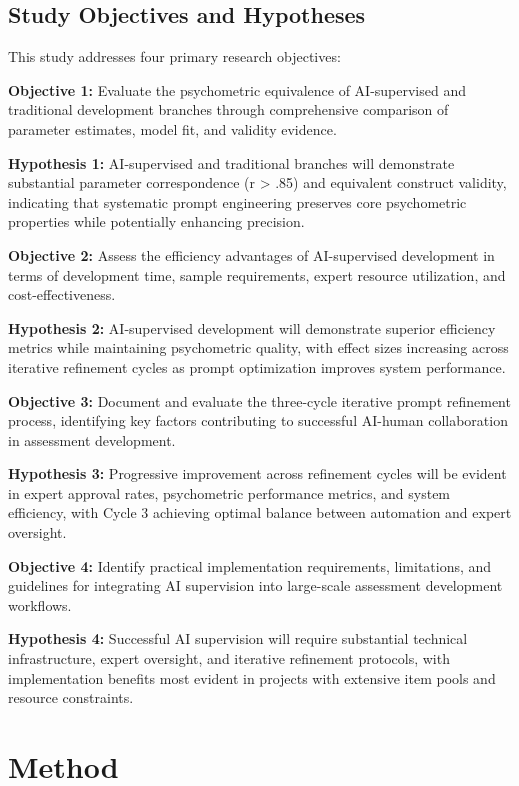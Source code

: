 \documentclass[12pt,a4paper]{article}
\begin{document}
\subsection{Study Objectives and Hypotheses}

This study addresses four primary research objectives:

\textbf{Objective 1:} Evaluate the psychometric equivalence of AI-supervised and traditional development branches through comprehensive comparison of parameter estimates, model fit, and validity evidence.

\textbf{Hypothesis 1:} AI-supervised and traditional branches will demonstrate substantial parameter correspondence (r > .85) and equivalent construct validity, indicating that systematic prompt engineering preserves core psychometric properties while potentially enhancing precision.

\textbf{Objective 2:} Assess the efficiency advantages of AI-supervised development in terms of development time, sample requirements, expert resource utilization, and cost-effectiveness.

\textbf{Hypothesis 2:} AI-supervised development will demonstrate superior efficiency metrics while maintaining psychometric quality, with effect sizes increasing across iterative refinement cycles as prompt optimization improves system performance.

\textbf{Objective 3:} Document and evaluate the three-cycle iterative prompt refinement process, identifying key factors contributing to successful AI-human collaboration in assessment development.

\textbf{Hypothesis 3:} Progressive improvement across refinement cycles will be evident in expert approval rates, psychometric performance metrics, and system efficiency, with Cycle 3 achieving optimal balance between automation and expert oversight.

\textbf{Objective 4:} Identify practical implementation requirements, limitations, and guidelines for integrating AI supervision into large-scale assessment development workflows.

\textbf{Hypothesis 4:} Successful AI supervision will require substantial technical infrastructure, expert oversight, and iterative refinement protocols, with implementation benefits most evident in projects with extensive item pools and resource constraints.

\section{Method}
\end{document}
